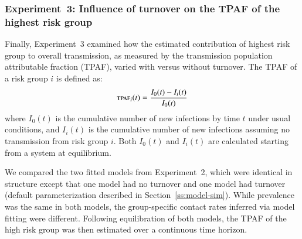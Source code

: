\subsubsection{Experiment~3: Influence of turnover on the TPAF of the highest risk group}
\label{sss:exp-tpaf}
Finally, Experiment~3 examined how
the estimated contribution of highest risk group to overall transmission,
as measured by the transmission population attributable fraction (TPAF),
varied with versus without turnover.
The TPAF of a risk group $i$ is defined as:
\begin{equation}
\textsc{tpaf}_i(t) = \frac{I_0(t) - I_i(t)}{I_0(t)}
\end{equation}
where $I_0(t)$ is the cumulative number of new infections
by time $t$ under usual conditions,
and $I_i(t)$ is the cumulative number of new infections
assuming no transmission from risk group $i$.
Both $I_0(t)$ and $I_i(t)$ are calculated
starting from a system at equilibrium.
\par
We compared the two fitted models from Experiment~2,
which were identical in structure except that
one model had no turnover and one model had turnover
(default parameterization described in Section~\ref{ss:model-sim}).
While prevalence was the same in both models,
the group-specific contact rates inferred via model fitting were different.
Following equilibration of both models,
the TPAF of the high risk group was then estimated over a continuous time horizon.
